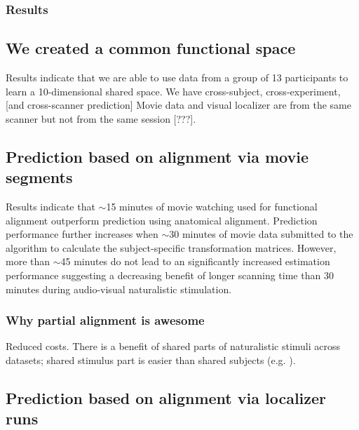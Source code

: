 \subsubsection{Results}




\subsection{We created a common functional space}

%
Results indicate that we are able to use data from a group of 13 participants to
learn a 10-dimensional shared space.
%
We have cross-subject, cross-experiment, [and cross-scanner prediction]
%
Movie data and visual localizer are from the same scanner but not from the same
session [???].



\subsection{Prediction based on alignment via movie segments}

%
Results indicate that $\sim$15 minutes of movie watching used for functional
alignment outperform prediction using anatomical alignment.
%
Prediction performance further increases when $\sim$30 minutes of movie data
submitted to the algorithm to calculate the subject-specific transformation
matrices.
%
However, more than $\sim$45 minutes do not lead to an significantly increased
estimation performance suggesting a decreasing benefit of longer scanning time
than 30 minutes during audio-visual naturalistic stimulation.



\subsubsection{Why partial alignment is awesome}



%
Reduced costs.
%
There is a benefit of shared parts of naturalistic stimuli across datasets;
shared stimulus part is easier than shared subjects (e.g.
\citep{zhang2018transfer}).



\subsection{Prediction based on alignment via localizer runs}


